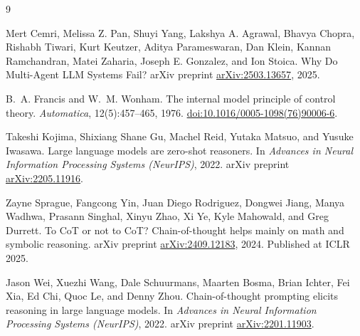 \documentclass[11pt]{article}
\begin{document}

\begin{thebibliography}{9}

Mert Cemri, Melissa Z. Pan, Shuyi Yang, Lakshya A. Agrawal, Bhavya
Chopra, Rishabh Tiwari, Kurt Keutzer, Aditya Parameswaran, Dan Klein,
Kannan Ramchandran, Matei Zaharia, Joseph E. Gonzalez, and Ion Stoica.
\newblock Why Do Multi-Agent {LLM} Systems Fail?
\newblock arXiv preprint \href{https://arxiv.org/abs/2503.13657}{arXiv:2503.13657}, 2025.

B.~A. Francis and W.~M. Wonham.
\newblock The internal model principle of control theory.
\newblock \emph{Automatica}, 12(5):457--465, 1976.
\newblock \href{https://doi.org/10.1016/0005-1098(76)90006-6}{doi:10.1016/0005-1098(76)90006-6}.

Takeshi Kojima, Shixiang Shane Gu, Machel Reid, Yutaka Matsuo, and
Yusuke Iwasawa.
\newblock Large language models are zero-shot reasoners.
\newblock In \emph{Advances in Neural Information Processing Systems
(NeurIPS)}, 2022.
\newblock arXiv preprint \href{https://arxiv.org/abs/2205.11916}{arXiv:2205.11916}.

Zayne Sprague, Fangcong Yin, Juan Diego Rodriguez, Dongwei Jiang, Manya
Wadhwa, Prasann Singhal, Xinyu Zhao, Xi Ye, Kyle Mahowald, and Greg
Durrett.
\newblock To {CoT} or not to {CoT}? {C}hain-of-thought helps mainly on
math and symbolic reasoning.
\newblock arXiv preprint \href{https://arxiv.org/abs/2409.12183}{arXiv:2409.12183}, 2024.
\newblock Published at ICLR 2025.

Jason Wei, Xuezhi Wang, Dale Schuurmans, Maarten Bosma, Brian Ichter,
Fei Xia, Ed Chi, Quoc Le, and Denny Zhou.
\newblock Chain-of-thought prompting elicits reasoning in large
language models.
\newblock In \emph{Advances in Neural Information Processing Systems
(NeurIPS)}, 2022.
\newblock arXiv preprint \href{https://arxiv.org/abs/2201.11903}{arXiv:2201.11903}.

\end{thebibliography}
\end{document}
